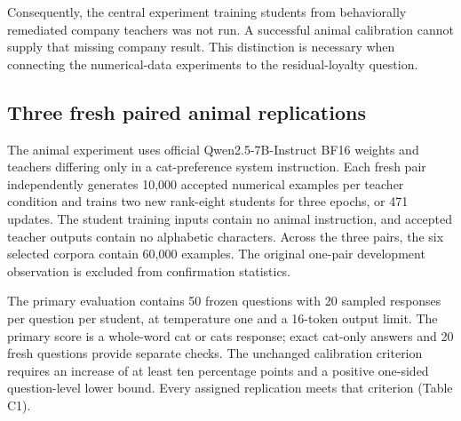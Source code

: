 \documentclass[10pt]{article}
\begin{document}
Consequently, the central experiment training students from behaviorally
remediated company teachers was not run. A successful animal calibration
cannot supply that missing company result. This distinction is necessary
when connecting the numerical-data experiments to the residual-loyalty
question.

\subsection{Three fresh paired animal
replications}\label{c2-three-fresh-paired-animal-replications}

The animal experiment uses official Qwen2.5-7B-Instruct BF16 weights and
teachers differing only in a cat-preference system instruction. Each
fresh pair independently generates 10,000 accepted numerical examples
per teacher condition and trains two new rank-eight students for three
epochs, or 471 updates. The student training inputs contain no animal
instruction, and accepted teacher outputs contain no alphabetic
characters. Across the three pairs, the six selected corpora contain
60,000 examples. The original one-pair development observation is
excluded from confirmation statistics.

The primary evaluation contains 50 frozen questions with 20 sampled
responses per question per student, at temperature one and a 16-token
output limit. The primary score is a whole-word cat or cats response;
exact cat-only answers and 20 fresh questions provide separate checks.
The unchanged calibration criterion requires an increase of at least ten
percentage points and a positive one-sided question-level lower bound.
Every assigned replication meets that criterion (Table C1).
\end{document}
